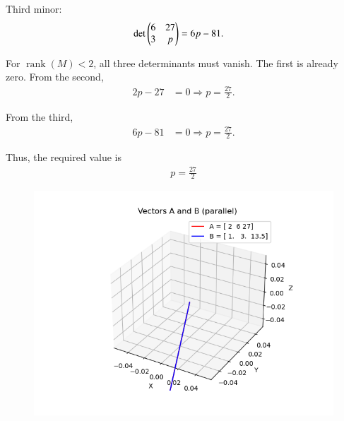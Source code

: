 \documentclass[journal]{IEEEtran}
\begin{document}
Third minor:
\begin{align}
\det\begin{pmatrix}6 & 27 \\ 3 & p\end{pmatrix} &= 6p - 81.
\end{align}

For $\operatorname{rank}(M)<2$, all three determinants must vanish. 
The first is already zero. From the second,
\begin{align}
2p - 27 &= 0  \Rightarrow  p = \tfrac{27}{2}.
\end{align}

From the third,
\begin{align}
6p - 81 &= 0  \Rightarrow  p = \tfrac{27}{2}.
\end{align}

Thus, the required value is
\begin{align}
\boxed{p = \tfrac{27}{2}}
\end{align}
\begin{figure}[H]
    \centering
    \includegraphics[width=0.5\linewidth]{figs/fig1.png}
    \caption{}
    \label{fig:fig1}
\end{figure}
\end{document}
